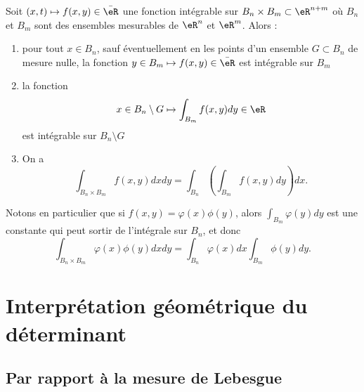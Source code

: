 \begin{theorem}[Fubini]\label{ThoFubini}
Soit $(x,t)\mapsto f(x,y)\in\bar \eR$ une fonction intégrable sur $B_n\times B_m\subset\eR^{n+m}$ où $B_n$ et $B_m$ sont des ensembles mesurables de $\eR^n$ et $\eR^m$. Alors :
\begin{enumerate}
\item pour tout $x\in B_n$, sauf éventuellement en les points d'un ensemble $G\subset B_n$ de mesure nulle, la fonction $y\in B_m\mapsto f(x,y)\in\bar\eR$ est intégrable sur $B_m$
\item
la fonction
\begin{equation}
	x\in B_n\setminus G\mapsto\int_{B_m}f(x,y)dy\in\eR
\end{equation}
est intégrable sur $B_n\setminus G$

\item 
On a
\begin{equation}
	\int_{B_n\times B_m}f(x,y)dxdy=\int_{B_n}\left( \int_{B_m}f(x,y)dy \right)dx.
\end{equation}

\end{enumerate}
\end{theorem}

Notons en particulier que si $f(x,y)=\varphi(x)\phi(y)$, alors $\int_{B_m}\varphi(y)dy$ est une constante qui peut sortir de l'intégrale sur $B_n$, et donc
\begin{equation}		\label{EqFubiniFactori}
	\int_{B_n\times B_m}\varphi(x)\phi(y)dxdy=\int_{B_n}\varphi(x)dx\int_{B_m}\phi(y)dy.
\end{equation}

\section{Interprétation géométrique du déterminant}

\subsection{Par rapport à la mesure de Lebesgue}

